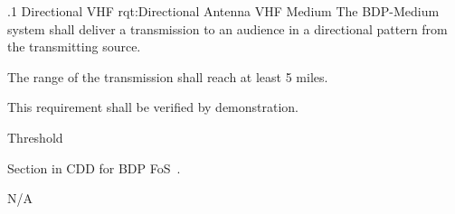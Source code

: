 \NRQMTT
{\RqtNumberBase.1}
{Directional VHF}
{rqt:Directional Antenna VHF Medium}
{The BDP-Medium system shall deliver a \VHF transmission to an audience in a directional pattern from the transmitting source.}%
{
	\item The range of the \VHF transmission shall reach at least 5 miles.
}
{This requirement shall be verified by demonstration.}
{
	\item [Phase 1] Threshold
}
{
\item [5.1.2] Section in CDD for BDP FoS~\cite{ref__BDP_FOS_CDD}.	
} 
{
	\item N/A
}


